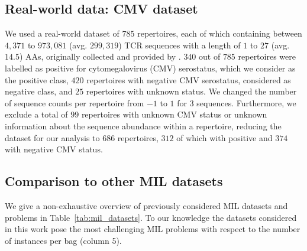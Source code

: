 \documentclass[oneside]{book}
\begin{document}
\subsection{Real-world data: CMV dataset}
We used a real-world dataset of $785$ repertoires,
each of which containing between $4,371$ to $973,081$ (avg. $299,319$) TCR sequences
with a length of $1$ to $27$ (avg. $14.5$) AAs, 
originally collected and provided by \citet{emerson2017immunosequencing}.
$340$ out of $785$ repertoires 
were labelled as positive for cytomegalovirus (CMV) serostatus, which we consider
as the positive class, $420$ repertoires with negative CMV serostatus, considered
as negative class, and $25$ repertoires with unknown status.
We changed the number of 
sequence counts per repertoire from $-1$ to $1$ 
for $3$ sequences.
Furthermore, 
we exclude a total of $99$ repertoires with unknown CMV status or unknown 
information about the sequence abundance within a repertoire, 
reducing the dataset for our analysis to $686$ repertoires, 
$312$ of which with positive and $374$ with negative CMV status.
%

%

%

\subsection{Comparison to other MIL datasets}
We give a non-exhaustive overview of previously considered
MIL datasets and problems in Table~\ref{tab:mil_datasets}. To our knowledge
the datasets considered in this work pose the most
challenging MIL problems with respect to the number of instances
per bag (column 5). 
\end{document}
